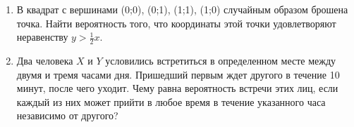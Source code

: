 \documentclass[a4paper,14pt]{extarticle}
\begin{document}
\begin{enumerate}
\item В квадрат с вершинами (0;0), (0;1), (1;1), (1;0) случайным образом
брошена точка. Найти вероятность того, что координаты этой точки
удовлетворяют неравенству $y > \frac{1}{2}x$.
\item Два человека $X$ и $Y$ условились встретиться в определенном месте между двумя и тремя часами дня. Пришедший первым ждет другого в течение 10 минут, после чего уходит. Чему равна вероятность встречи этих лиц, если каждый из них может прийти в любое время в течение указанного часа независимо от другого?
\end{enumerate}
\end{document}
